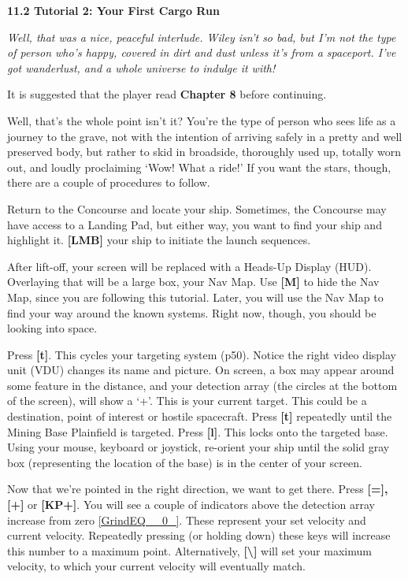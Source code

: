 \documentclass{article}
\begin{document}
\textbf{}

\textbf{11.2 Tutorial 2: Your First Cargo Run }

\textit{Well, that was a nice, peaceful interlude. Wiley isn't so bad, but I'm not the type of person who's happy, covered in dirt and dust unless it's from a spaceport. I've got wanderlust, and a whole universe to indulge it with! }

It is suggested that the player read \textbf{Chapter 8} before continuing. 

Well, that's the whole point isn't it? You're the type of person who sees life as a journey to the grave, not with the intention of arriving safely in a pretty and well preserved body, but rather to skid in broadside, thoroughly used up, totally worn out, and loudly proclaiming `Wow! What a ride!' If you want the stars, though, there are a couple of procedures to follow. 

Return to the Concourse and locate your ship. Sometimes, the Concourse may have access to a Landing Pad, but either way, you want to find your ship and highlight it. \textbf{[LMB] }your ship to initiate the launch sequences. 

After lift-off, your screen will be replaced with a Heads-Up Display (HUD). Overlaying that will be a large box, your Nav Map. Use \textbf{[M] }to hide the Nav Map, since you are following this tutorial. Later, you will use the Nav Map to find your way around the known systems. Right now, though, you should be looking into space. 



Press \textbf{[t]}. This cycles your targeting system (p50). Notice the right video display unit (VDU) changes its name and picture. On screen, a box may appear around some feature in the distance, and your detection array (the circles at the bottom of the screen), will show a `+'. This is your current target. This could be a destination, point of interest or hostile spacecraft. Press \textbf{[t] }repeatedly until the Mining Base Plainfield is targeted. Press \textbf{[l]}. This locks onto the targeted base. Using your mouse, keyboard or joystick, re-orient your ship until the solid gray box (representing the location of the base) is in the center of your screen. 

Now that we're pointed in the right direction, we want to get there. Press \textbf{[=], [+] }or \textbf{[KP+]}. You will see a couple of indicators above the detection array increase from zero \eqref{GrindEQ__0_}. These represent your set velocity and current velocity. Repeatedly pressing (or holding down) these keys will increase this number to a maximum point. Alternatively, \textbf{[\textbackslash ] }will set your maximum velocity, to which your current velocity will eventually match. 
\end{document}
